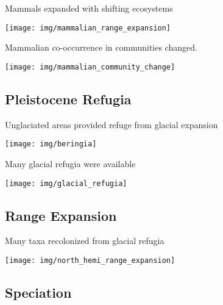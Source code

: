 \documentclass[xcolor=svgnames]{beamer}
\begin{document}
\begin{frame}{Mammals expanded with shifting ecosystems}
	\begin{center}
		\texttt{[image: img/mammalian\_range\_expansion]}
	\end{center}
\end{frame}

\begin{frame}{Mammalian co-occurrence in communities changed.}
	\begin{center}
		\texttt{[image: img/mammalian\_community\_change]}
	\end{center}
\end{frame}

\subsection{Pleistocene Refugia}

\begin{frame}{Unglaciated areas provided refuge from glacial expansion}
		\begin{center}
			\texttt{[image: img/beringia]}
		\end{center}
\end{frame}

\begin{frame}{Many glacial refugia were available}
	\begin{center}
		\texttt{[image: img/glacial\_refugia]}
	\end{center}
\end{frame}

\subsection{Range Expansion}

\begin{frame}{Many taxa recolonized from glacial refugia}
		\begin{center}
			\texttt{[image: img/north\_hemi\_range\_expansion]}
		\end{center}
\end{frame}

\subsection{Speciation}
\end{document}
